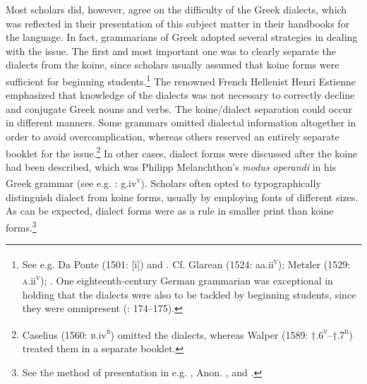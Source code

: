 Most scholars did, however, agree on the difficulty of the Greek dialects, which was reflected in their presentation of this subject matter in their handbooks for the language. In fact, grammarians of Greek adopted several strategies in dealing with the issue. The first and most important one was to clearly separate the dialects from the koine, since scholars usually assumed that koine forms were sufficient for beginning students.\footnote{See e.g. Da Ponte (1501: [i]) and \citet[223]{Tavoni1986}. Cf. Glarean (1524: aa.ii\textsc{\textsuperscript{v}}); Metzler (1529: \textsc{a}.ii\textsc{\textsuperscript{v}}); \citet[105]{Rollin1726}. One eighteenth-century German grammarian was exceptional in holding that the dialects were also to be tackled by beginning students, since they were omnipresent (\citealt{Trendelenburg1782}: 174–175).} The renowned French Hellenist Henri Estienne emphasized that knowledge of the dialects was not necessary to correctly decline and conjugate Greek nouns and verbs. The koine/dialect separation could occur in different manners. Some grammars omitted dialectal information altogether in order to avoid overcomplication, whereas others reserved an entirely separate booklet for the issue.\footnote{Caselius (1560: \textsc{b.}iv\textsc{\textsuperscript{r}}) omitted the dialects, whereas Walper (1589: †.6\textsc{\textsuperscript{v}}–†.7\textsc{\textsuperscript{r}}) treated them in a separate booklet.} In other cases, dialect forms were discussed after the koine had been described, which was Philipp Melanchthon’s \textit{modus} \textit{operandi} in his Greek grammar (see e.g. \citealt{Melanchthon1518}: g.iv\textsc{\textsuperscript{v}}). Scholars often opted to typographically distinguish dialect from koine forms, usually by employing fonts of different sizes. As can be expected, dialect forms were as a rule in smaller print than koine forms.\footnote{See the method of presentation in e.g. \citet{Gretser1593}, Anon. , and \citet{Lancelot1655}.}

